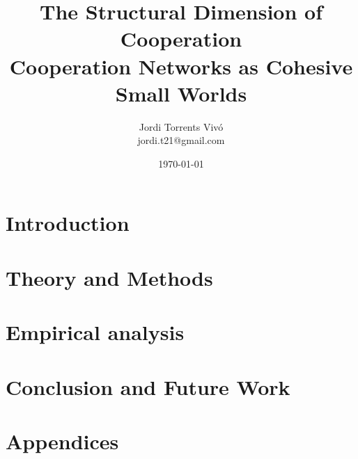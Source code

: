\documentclass[a4paper,12pt]{memoir}
\title{\Huge {The Structural Dimension of Cooperation}\\ \Large{Cooperation Networks as Cohesive Small Worlds}}
\author{Jordi Torrents Vivó \\jordi.t21@gmail.com}
\date{\today}
\begin{document}
\frontmatter
    
    
    
    

    \setcounter{tocdepth}{3}
    \tableofcontents
    \newpage
    \listoffigures
    \newpage
    \listoftables
    \newpage


\mainmatter
    \part{Introduction}
        

    \part{Theory and Methods}
        
        

    \part{Empirical analysis}
        
        
        

    \part{Conclusion and Future Work}
        

    \part{Appendices}
    \appendix
        
        
        
        

\backmatter
    
    
\end{document}
